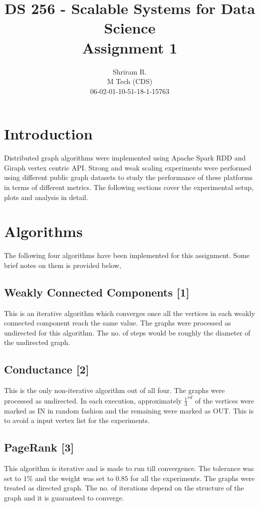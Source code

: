 \documentclass[11pt,a4paper,oneside]{article}
\begin{document}
	\title{DS 256 - Scalable Systems for Data Science \\ Assignment 1}
	\author{Shriram R. \\ M Tech (CDS) \\ 06-02-01-10-51-18-1-15763}
	\maketitle
	
	\section{Introduction}
	Distributed graph algorithms were implemented using Apache Spark RDD and Giraph vertex centric API. Strong and weak scaling experiments were performed using different public graph datasets to study the performance of these platforms in terms of different metrics. The following sections cover the experimental setup, plots and analysis in detail.  
	
	\section{Algorithms}
	The following four algorithms have been implemented for this assignment. Some brief notes on them is provided below,
	
	\subsection{Weakly Connected Components [1]}
	This is an iterative algorithm which converges once all the vertices in each weakly connected component reach the same value. The graphs were processed as undirected for this algorithm. The no. of steps would be roughly the diameter of the undirected graph.
	
	\subsection{Conductance [2]}
	This is the only non-iterative algorithm out of all four. The graphs were processed as undirected. In each execution, approximately $\frac{1}{3}^{rd}$ of the vertices were marked as IN in random fashion and the remaining were marked as OUT. This is to avoid a input vertex list for the experiments.
	
	\subsection{PageRank [3]}
	This algorithm is iterative and is made to run till convergence. The tolerance was set to $1\%$ and the weight was set to $0.85$ for all the experiments. The graphs were treated as directed graph. The no. of iterations depend on the structure of the graph and it is guaranteed to converge. 
	
\end{document}
